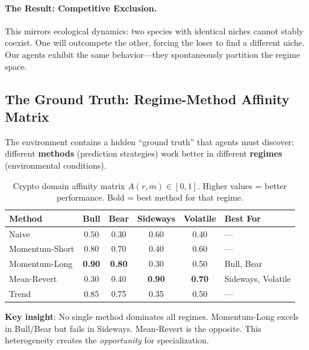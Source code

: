 \paragraph{The Result: Competitive Exclusion.}

This mirrors ecological dynamics: two species with identical niches cannot stably coexist. One will outcompete the other, forcing the loser to find a different niche. Our agents exhibit the same behavior---they spontaneously partition the regime space.


\subsection{The Ground Truth: Regime-Method Affinity Matrix}

The environment contains a hidden ``ground truth'' that agents must discover: different \textbf{methods} (prediction strategies) work better in different \textbf{regimes} (environmental conditions).

\begin{table}[h]
\centering
\small
\caption{Crypto domain affinity matrix $A(r, m) \in [0,1]$. Higher values = better performance. Bold = best method for that regime.}
\begin{tabular}{l|cccc|l}
\toprule
\textbf{Method} & \textbf{Bull} & \textbf{Bear} & \textbf{Sideways} & \textbf{Volatile} & \textbf{Best For} \\
\midrule
Naive & 0.50 & 0.30 & 0.60 & 0.40 & --- \\
Momentum-Short & 0.80 & 0.70 & 0.40 & 0.60 & --- \\
Momentum-Long & \textbf{0.90} & \textbf{0.80} & 0.30 & 0.50 & Bull, Bear \\
Mean-Revert & 0.30 & 0.40 & \textbf{0.90} & \textbf{0.70} & Sideways, Volatile \\
Trend & 0.85 & 0.75 & 0.35 & 0.50 & --- \\
\bottomrule
\end{tabular}
\label{tab:affinity}
\end{table}

\textbf{Key insight}: No single method dominates all regimes. Momentum-Long excels in Bull/Bear but fails in Sideways. Mean-Revert is the opposite. This heterogeneity creates the \textit{opportunity} for specialization.

